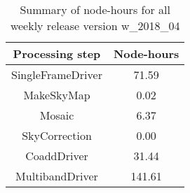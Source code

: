 \begin{table}[h]
  \centering
  \begin{tabular} {|c|c|}
    \hline
    Processing step & Node-hours \\
    \hline
    SingleFrameDriver &  71.59 \\ 
    MakeSkyMap        &   0.02 \\
    Mosaic            &   6.37 \\
    SkyCorrection     &   0.00 \\
    CoaddDriver       &  31.44 \\
    MultibandDriver   & 141.61 \\
    \hline
  \end{tabular}
  \caption{Summary of node-hours for all weekly release version w\_2018\_04}
  \label{tbl:PerTask04}
\end{table}
